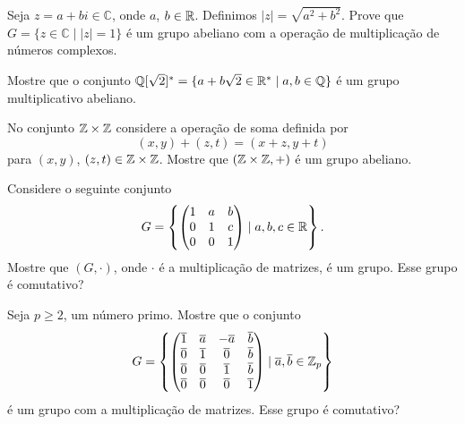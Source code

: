 \documentclass[12pt]{exam}
\begin{document}
    \vspace{.3cm}

    \questao{} Seja $z  = a + bi \in \mathbb{C}$, onde $a$, $b \in \mathbb{R}$. Definimos $|z| = \sqrt{a^2 + b^2}$. Prove que $G=\{z \in \mathbb{C} \mid |z| = 1\}$ {\'e} um grupo
    abeliano com a opera{\c c}{\~a}o de multiplica{\c c}{\~a}o de n{\'u}meros complexos.

    \vspace{.3cm}

    \questao{} Mostre que o conjunto $\mathbb{Q}[\sqrt{2}]^*=\{ a + b\sqrt{2} \in
    \mathbb{R}^* \mid  a, b \in \mathbb{Q} \}$ {\'e} um grupo multiplicativo abeliano.

    \vspace{.3cm}

    \questao{} No conjunto $\mathbb{Z} \times \mathbb{Z}$ considere a opera\c{c}\~ao de soma definida por
    \[
        (x, y) + (z, t) = (x + z, y + t)
    \]
    para $(x, y)$, $(z, t) \in \mathbb{Z} \times \mathbb{Z}$. Mostre que $(\mathbb{Z}\times\mathbb{Z}, +)$ \'e um grupo abeliano.

    \vspace{.3cm}

    \questao{} Considere o seguinte conjunto
    \[
        G = \left\{\begin{pmatrix} 1 & a & b\\ 0 & 1 & c \\ 0 & 0 & 1\end{pmatrix} \mid a, b, c \in \mathbb{R}\right\}.
    \]
    Mostre que $(G, \cdot)$, onde $\cdot$ é a multiplicação de matrizes, é um grupo. Esse grupo é comutativo?

    \vspace{.3cm}

    \questao{} Seja $p \ge 2$, um número primo. Mostre que o conjunto
    \[
        G = \left\{
                    \begin{pmatrix}
                        \overline{1} & \overline{a} & -\overline{a} & \overline{b}\\
                        \overline{0} & \overline{1} & \overline{0} & \overline{b}\\
                        \overline{0} & \overline{0} & \overline{1} & \overline{b}\\
                        \overline{0} & \overline{0} & \overline{0} & \overline{1}\\
                    \end{pmatrix}
                \mid \overline{a}, \overline{b} \in \mathbb{Z}_p
            \right\}
    \]
    é um grupo com a multiplicação de matrizes. Esse grupo é comutativo?
    \vspace{.3cm}
\end{document}
